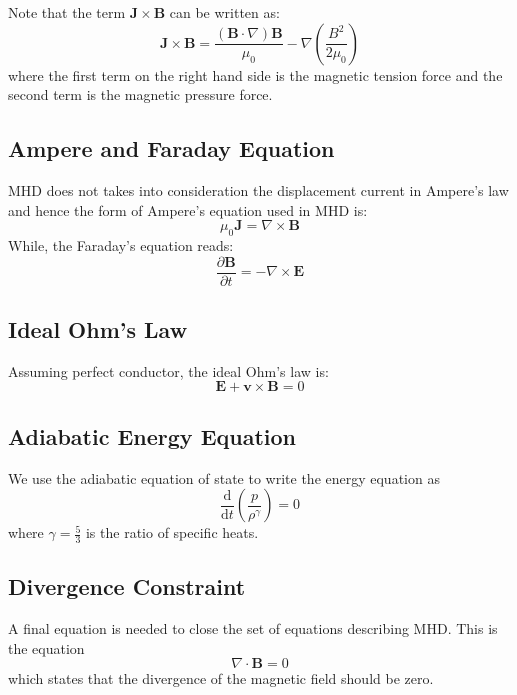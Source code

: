\documentclass[12pt]{article}
\newenvironment{changemargin}[2]{%
\begin{list}{}{%
\setlength{\topsep}{0pt}%
\setlength{\leftmargin}{#1}%
\setlength{\rightmargin}{#2}%
\setlength{\listparindent}{\parindent}%
\setlength{\itemindent}{\parindent}%
\setlength{\parsep}{\parskip}%
}%
\item[]}{\end{list}}
\begin{document}
\begin{changemargin}{-2cm}{-2cm}
    Note that the term $\mathbf {J} \times \mathbf {B}$ can be written as:
    \begin{equation}\label{eq:j-b}
        \mathbf {J} \times \mathbf {B} ={\frac {\left(\mathbf {B} \cdot \nabla \right)\mathbf {B} }{\mu _{0}}}-\nabla \left({\frac {B^{2}}{2\mu _{0}}}\right)
    \end{equation}
    where the first term on the right hand side is the magnetic tension force and the second term is the magnetic pressure force.

    \subsection{Ampere and Faraday Equation}
    MHD does not takes into consideration the displacement current in Ampere's law and hence the form of Ampere's equation used in MHD is:
    \begin{equation}\label{eq:apmere}
        \mu _{0}\mathbf {J} =\nabla \times \mathbf {B}
    \end{equation}
    While, the Faraday's equation reads:
    \begin{equation}\label{eq:faraday}
        {\frac {\partial \mathbf {B} }{\partial t}}=-\nabla \times \mathbf {E}
    \end{equation}
    \subsection{Ideal Ohm's Law}
    Assuming perfect conductor, the ideal Ohm's law is:
    \begin{equation}\label{eq:ohm}
        \mathbf {E} +\mathbf {v} \times \mathbf {B} =0
    \end{equation}

    \subsection{Adiabatic Energy Equation}
    We use the adiabatic equation of state to write the energy equation as
    \begin{equation}\label{eq:energy}
        {\frac {\mathrm {d} }{\mathrm {d} t}}\left({\frac {p}{\rho ^{\gamma }}}\right)=0
    \end{equation}
    where $\gamma = \frac{5}{3}$ is the ratio of specific heats.

    \subsection{Divergence Constraint}
    A final equation is needed to close the set of equations describing MHD. This is the equation
    \begin{equation}\label{eq:divergence}
        \nabla \cdot \mathbf {B} =0
    \end{equation}
    which states that the divergence of the magnetic field should be zero.


\end{changemargin}
\end{document}
